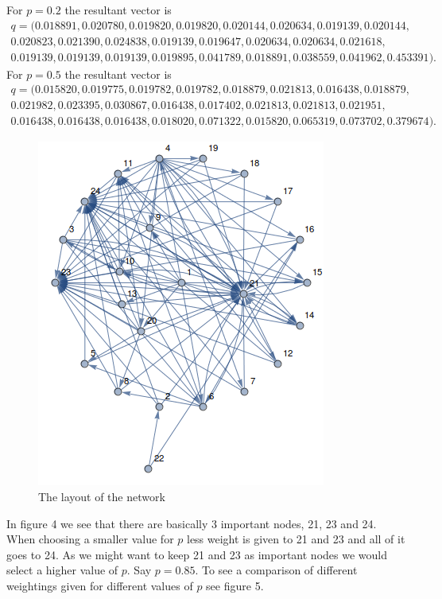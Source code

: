 \documentclass{unswmaths}
\begin{document}
For $ p = 0.2 $ the resultant vector is
\begin{align*}
    q = (
   0.018891,
   0.020780,
   0.019820,
   0.019820,
   0.020144,
   0.020634,
   0.019139,
   0.020144, \\
   0.020823,
   0.021390,
   0.024838,
   0.019139,
   0.019647,
   0.020634,
   0.020634,
   0.021618, \\
   0.019139,
   0.019139,
   0.019139,
   0.019895,
   0.041789,
   0.018891,
   0.038559,
   0.041962,
   0.453391 
).
\end{align*}
For $ p = 0.5 $ the resultant vector is
\begin{align*}
    q = (
   0.015820,
   0.019775,
   0.019782,
   0.019782,
   0.018879,
   0.021813,
   0.016438,
   0.018879, \\
   0.021982,
   0.023395,
   0.030867,
   0.016438,
   0.017402,
   0.021813,
   0.021813,
   0.021951, \\
   0.016438,
   0.016438,
   0.016438,
   0.018020,
   0.071322,
   0.015820,
   0.065319,
   0.073702,
   0.379674 
).
\end{align*}
\begin{figure}[h]
    \includegraphics[scale=0.8]{Graph}
    \caption{The layout of the network}
\end{figure}
In figure 4 we see that there are basically 3 important nodes, 21, 23 and 24. When choosing a smaller value for $ p $ less weight is given to 21 and 23 and all of it goes to 24. As we might want to keep 21 and 23 as important nodes we would select a higher value of $ p $. Say $ p = 0.85 $.
To see a comparison of different weightings given for different values of $ p $ see figure 5.
\end{document}
